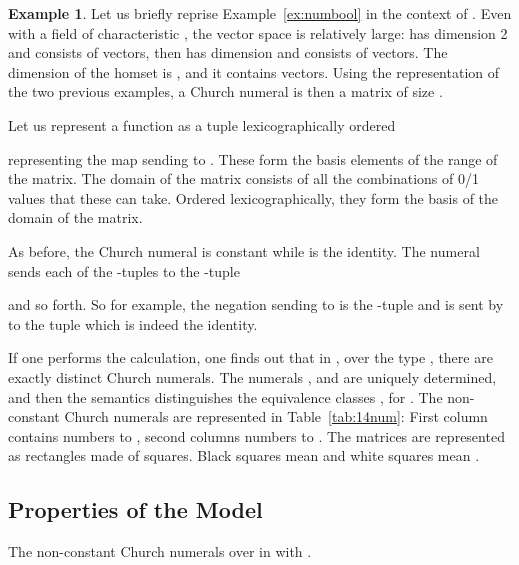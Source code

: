 \documentclass[10pt]{article}
\theoremstyle{plain}
\theoremstyle{definition}
\newtheorem{example}[theorem]{Example}
\begin{document}
\begin{example}
  \label{ex:numbool-alg}
  Let us briefly reprise Example~\ref{ex:numbool} in
  the context of . Even with a field of characteristic
  , the vector space  is
  relatively
  large:  has dimension 2 and consists of  vectors, 
  then has dimension  and consists of  vectors. The dimension
  of the homset  is , and it contains 
  vectors. Using the representation of the two previous examples, a
  Church numeral is then a matrix of size .
  
  Let us represent a function  as a tuple  lexicographically ordered
  
  representing the map sending  to
  .
  These form the basis elements of the range of the matrix. The
  domain of the matrix consists of all the  combinations of 0/1
  values that these can take. Ordered lexicographically, they form the
  basis of the domain of the matrix.
  
  As before, the Church numeral  is constant while 
   is the identity. 
  The numeral  sends each of the -tuples  to the -tuple
  
  and so forth.
So for example, the negation sending  to  is the -tuple
   and is sent by  to the tuple
   which is indeed the identity.
  
  If one performs the calculation, one finds out that in
  , over the type , there are exactly  distinct
  Church numerals. The numerals ,  and  are
  uniquely determined, and then the semantics distinguishes the
  equivalence classes , for
  . The  non-constant Church numerals are
  represented in Table~\ref{tab:14num}: First column contains numbers 
  to , second columns numbers  to . The matrices are represented
  as rectangles made of  squares. Black squares mean 
  and white squares mean .
\end{example}



\subsection{Properties of the \texorpdfstring{}{FinVec} Model}


\begin{table*}[b]
  \caption{The  non-constant Church numerals over  in  with .}
  \label{tab:14num}
  \def\b{\rule{0.026cm}{0.03cm}}
  \def\a{\phantom{\rule{0.026cm}{0.03cm}}}
  \def\mynl{\-1ex]}
  \scalebox{.89}{\begin{minipage}{5.32in}
 \end{minipage}}
\end{table*}
\end{document}
